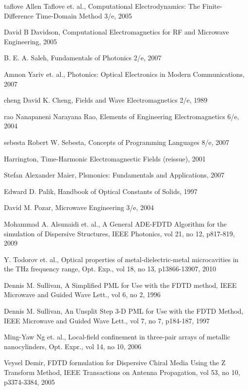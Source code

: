\cleardoublepage
{}
\begin{thebibliography}{999}
  \bibitem
  {taflove}
  Allen Taflove et. al., Computational Electrodynamics: The Finite-Difference Time-Domain Method 3/e, 2005
 
  \bibitem
  {}
  David B Davidson, Computational Electromagnetics for RF and Microwave Engineering, 2005

  \bibitem
  {}
  B. E. A. Saleh, Fundamentals of Photonics 2/e, 2007

  \bibitem
  {}
  Amnon Yariv et. al., Photonics: Optical Electronics in Modern Communications, 2007

  \bibitem
  {cheng}
  David K. Cheng, Fields and Wave Electromagnetics 2/e, 1989

  \bibitem
  {rao} 
  Nanapaneni Narayana Rao, Elements of Engineering Electromagnetics 6/e, 2004

  \bibitem
  {sebesta}
  Robert W. Sebesta, Concepts of Programming Languages 8/e, 2007

  \bibitem
  {}
  Harrington, Time-Harmonic Electromagnectic Fields (reissue), 2001

  \bibitem
  {}
  Stefan Alexander Maier, Plsmonics: Fundamentals and Applications, 2007

  \bibitem
  {}
  Edward D. Palik, Handbook of Optical Constants of Solids, 1997

  \bibitem
  {}
  David M. Pozar, Microwave Engineering 3/e, 2004

  \bibitem
  {}
  Mohammad A. Alsunaidi et. al., A General ADE-FDTD Algorithm for the simulation of Dispersive Structures, IEEE Photonics, vol 21, no 12, p817-819, 2009

  \bibitem
  {}
  Y. Todorov et. al., Optical properties of metal-dielectric-metal microcavities in the THz frequency range, Opt. Exp., vol 18, no 13, p13866-13907, 2010

  \bibitem
  {}
  Dennis M. Sullivan, A Simplified PML for Use with the FDTD method, IEEE Microwave and Guided Wave Lett., vol 6, no 2, 1996

  \bibitem
  {}
  Dennis M. Sullivan, An Unsplit Step 3-D PML for Use with the FDTD Method, IEEE Microwave and Guided Wave Lett., vol 7, no 7, p184-187, 1997

  \bibitem
  {}
  Ming-Yaw Ng et. al., Local-field confinement in three-pair arrays of metallic nanocylinders, Opt. Expr., vol 14, no 10, 2006

  \bibitem
  {}
  Veysel Demir, FDTD formulation for Dispersive Chiral Media Using the Z Transform Method, IEEE Transactions on Antenna Propagation, vol 53, no 10, p3374-3384, 2005


\end{thebibliography}
